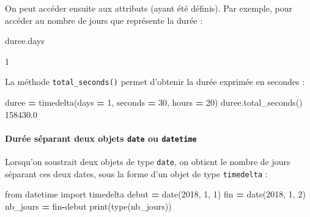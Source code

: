 \documentclass[12pt,]{book}
\newenvironment{Shaded}{\begin{snugshade}}{\end{snugshade}}
\newcommand{\DecValTok}[1]{\textcolor[rgb]{0.00,0.00,0.81}{#1}}
\newcommand{\FloatTok}[1]{\textcolor[rgb]{0.00,0.00,0.81}{#1}}
\newcommand{\ImportTok}[1]{#1}
\newcommand{\OperatorTok}[1]{\textcolor[rgb]{0.81,0.36,0.00}{\textbf{#1}}}
\newcommand{\BuiltInTok}[1]{#1}
\newcommand{\NormalTok}[1]{#1}
\let\oldparagraph\paragraph
\renewcommand{\paragraph}[1]{\oldparagraph{#1}\mbox{}}
\numberwithin{equation}{section}
\numberwithin{countremarque}{section}
\begin{document}
On peut accéder ensuite aux attributs (ayant été définis). Par exemple,
pour accéder au nombre de jours que représente la durée :

\begin{Shaded}
\begin{Highlighting}[]
\NormalTok{duree.days}
\end{Highlighting}
\end{Shaded}

\begin{Shaded}
\begin{Highlighting}[]
\DecValTok{1}
\end{Highlighting}
\end{Shaded}

La méthode \texttt{total\_seconds()} permet d'obtenir la durée exprimée
en secondes :

\begin{Shaded}
\begin{Highlighting}[]
\NormalTok{duree }\OperatorTok{=}\NormalTok{ timedelta(days }\OperatorTok{=} \DecValTok{1}\NormalTok{, seconds }\OperatorTok{=} \DecValTok{30}\NormalTok{, hours }\OperatorTok{=} \DecValTok{20}\NormalTok{)}
\NormalTok{duree.total_seconds()}
\FloatTok{158430.0}
\end{Highlighting}
\end{Shaded}

\paragraph{\texorpdfstring{Durée séparant deux objets \texttt{date} ou
\texttt{datetime}}{Durée séparant deux objets date ou datetime}}\label{duree-separant-deux-objets-date-ou-datetime}

Lorsqu'on soustrait deux objets de type \texttt{date}, on obtient le
nombre de jours séparant ces deux dates, sous la forme d'un objet de
type \texttt{timedelta} :

\begin{Shaded}
\begin{Highlighting}[]
\ImportTok{from}\NormalTok{ datetime }\ImportTok{import}\NormalTok{ timedelta}
\NormalTok{debut }\OperatorTok{=}\NormalTok{ date(}\DecValTok{2018}\NormalTok{, }\DecValTok{1}\NormalTok{, }\DecValTok{1}\NormalTok{)}
\NormalTok{fin }\OperatorTok{=}\NormalTok{ date(}\DecValTok{2018}\NormalTok{, }\DecValTok{1}\NormalTok{, }\DecValTok{2}\NormalTok{)}
\NormalTok{nb_jours }\OperatorTok{=}\NormalTok{ fin}\OperatorTok{-}\NormalTok{debut}
\BuiltInTok{print}\NormalTok{(}\BuiltInTok{type}\NormalTok{(nb_jours))}
\end{Highlighting}
\end{Shaded}
\end{document}
